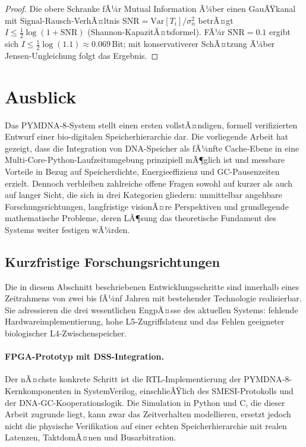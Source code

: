﻿\documentclass[a4paper,12pt]{article}
\theoremstyle{definition}
\begin{document}
\begin{proof}
  Die obere Schranke fÃ¼r Mutual Information Ã¼ber einen GauÃŸkanal mit
  Signal-Rausch-VerhÃ¤ltnis $\mathrm{SNR} = \mathrm{Var}[T_i] / \sigma_n^2$
  betrÃ¤gt $I \le \frac{1}{2}\log(1 + \mathrm{SNR})$ (Shannon-KapazitÃ¤tsfor\-mel).
  FÃ¼r $\mathrm{SNR} = 0.1$ ergibt sich $I \le \frac{1}{2}\log(1.1) \approx 0.069$\,Bit;
  mit konservativerer SchÃ¤tzung Ã¼ber Jensen-Ungleichung folgt das Ergebnis.
\end{proof}

\section{Ausblick}

Das PYMDNA-8-System stellt einen ersten vollstÃ¤ndigen, formell verifizierten Entwurf einer bio-digitalen Speicherhierarchie dar. Die vorliegende Arbeit hat gezeigt, dass die Integration von DNA-Speicher als fÃ¼nfte Cache-Ebene in eine Multi-Core-Python-Laufzeitumgebung prinzipiell mÃ¶glich ist und messbare Vorteile in Bezug auf Speicherdichte, Energieeffizienz und GC-Pausenzeiten erzielt. Dennoch verbleiben zahlreiche offene Fragen sowohl auf kurzer als auch auf langer Sicht, die sich in drei Kategorien gliedern: unmittelbar angehbare Forschungsrichtungen, langfristige visionÃ¤re Perspektiven und grundlegende mathematische Probleme, deren LÃ¶sung das theoretische Fundament des Systems weiter festigen wÃ¼rden.

\subsection{Kurzfristige Forschungsrichtungen}

Die in diesem Abschnitt beschriebenen Entwicklungsschritte sind innerhalb eines Zeitrahmens von zwei bis fÃ¼nf Jahren mit bestehender Technologie realisierbar. Sie adressieren die drei wesentlichen EngpÃ¤sse des aktuellen Systems: fehlende Hardwareimplementierung, hohe L5-Zugriffslatenz und das Fehlen geeigneter biologischer L4-Zwischenspeicher.

\paragraph{FPGA-Prototyp mit DSS-Integration.}
Der nÃ¤chste konkrete Schritt ist die RTL-Implementie\-rung der PYMDNA-8-Kernkomponenten in SystemVerilog, einschlieÃŸlich des SMESI-Protokolls und der DNA-GC-Kooperationslogik. Die Simulation in Python und C, die dieser Arbeit zugrunde liegt, kann zwar das Zeitverhalten modellieren, ersetzt jedoch nicht die physische Verifikation auf einer echten Speicherhierarchie mit realen Latenzen, TaktdomÃ¤nen und Busarbitration.
\end{document}
